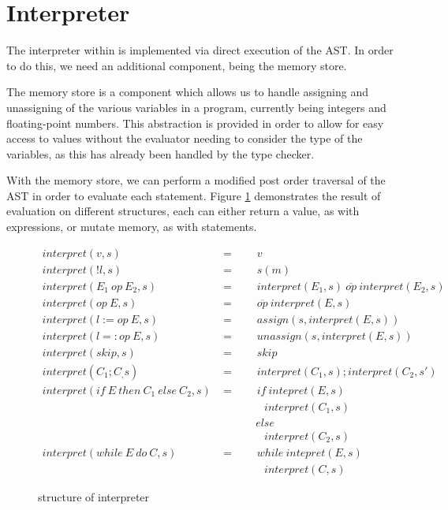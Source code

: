 \section{Interpreter}

The interpreter within \rimp is implemented via direct execution of the AST. In order to do this, we need an additional component, being the memory store. 

The memory store is a component which allows us to handle assigning and unassigning of the various variables in a \rimp program, currently being integers and floating-point numbers. This abstraction is provided in order to allow for easy access to values without the evaluator needing to consider the type of the variables, as this has already been handled by the type checker.

With the memory store, we can perform a modified post order traversal of the AST in order to evaluate each statement. Figure \ref{fig:interpret} demonstrates the result of evaluation on different structures, each can either return a value, as with expressions, or mutate memory, as with statements.

\begin{figure}[hbt!]
    \centering
    \small
    \begin{align*}
        interpret(v, s) &=\quad\quad v \tag{value} \\
        interpret(!l, s) &=\quad\quad s(m) \tag{variable} \\
        interpret(E_1\ op\ E_2, s) &=\quad\quad interpret(E_1, s)\ \overline{op}\ interpret(E_2, s) \tag{binary operation} \\
        interpret(op\ E, s) &=\quad\quad \overline{op}\ interpret(E, s) \tag{unary operation} \\
        interpret(l := op\ E, s) &=\quad\quad assign(s, interpret(E, s))\tag{assign} \\
        interpret(l =: op\ E, s) &=\quad\quad unassign(s, interpret(E, s))\tag{unassign} \\
        interpret(skip, s) &=\quad\quad skip \tag{skip} \\
        interpret(C_1;C_, s) &=\quad\quad interpret(C_1, s); interpret(C_2, s') \tag{sequence} \\
        interpret(if\ E\ then\ C_1\ else\ C_2, s) &=\quad\quad if\ intepret(E, s)\\ 
        &\quad\quad\quad\quad interpret(C_1, s)\\ 
        &\quad\quad\quad\ else\\ 
        &\quad\quad\quad\quad interpret(C_2, s) \tag{if} \\
        interpret(while\ E\ do\ C, s) &=\quad\quad while\ intepret(E, s)\\ 
        &\quad\quad\quad\quad interpret(C, s)  \tag{while}
    \end{align*}
    \caption{structure of interpreter}
    \label{fig:interpret}
\end{figure}

